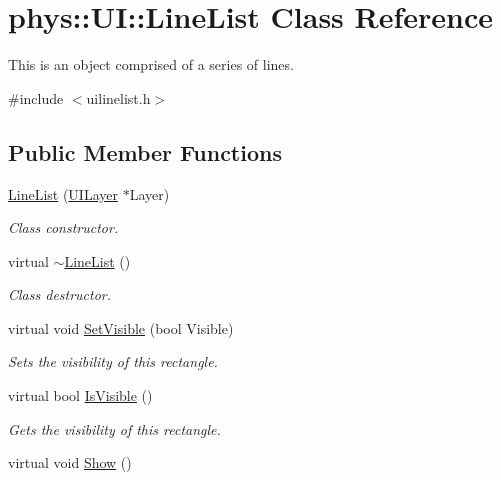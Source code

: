 \hypertarget{classphys_1_1UI_1_1LineList}{
\section{phys::UI::LineList Class Reference}
\label{d7/de8/classphys_1_1UI_1_1LineList}
}


This is an object comprised of a series of lines.  




{\ttfamily \#include $<$uilinelist.h$>$}

\subsection*{Public Member Functions}
\begin{DoxyCompactItemize}
\item 
\hyperlink{classphys_1_1UI_1_1LineList_a0de86be9d9ecbd6f903cc15e6f44e135}{LineList} (\hyperlink{classphys_1_1UILayer}{UILayer} $\ast$Layer)
\begin{DoxyCompactList}\small\item\em Class constructor. \item\end{DoxyCompactList}\item 
\hypertarget{classphys_1_1UI_1_1LineList_ae962ca10492137ed85f7b66a79d4887e}{
virtual \hyperlink{classphys_1_1UI_1_1LineList_ae962ca10492137ed85f7b66a79d4887e}{$\sim$LineList} ()}
\label{d7/de8/classphys_1_1UI_1_1LineList_ae962ca10492137ed85f7b66a79d4887e}

\begin{DoxyCompactList}\small\item\em Class destructor. \item\end{DoxyCompactList}\item 
virtual void \hyperlink{classphys_1_1UI_1_1LineList_acecf11c133825233afd73d55ba9e4c1d}{SetVisible} (bool Visible)
\begin{DoxyCompactList}\small\item\em Sets the visibility of this rectangle. \item\end{DoxyCompactList}\item 
virtual bool \hyperlink{classphys_1_1UI_1_1LineList_af8c50f2e60b5a087cc9f3a280e10bd72}{IsVisible} ()
\begin{DoxyCompactList}\small\item\em Gets the visibility of this rectangle. \item\end{DoxyCompactList}\item 
\hypertarget{classphys_1_1UI_1_1LineList_ae725a770a9b938d01f1a161be050fcc5}{
virtual void \hyperlink{classphys_1_1UI_1_1LineList_ae725a770a9b938d01f1a161be050fcc5}{Show} ()}
\label{d7/de8/classphys_1_1UI_1_1LineList_ae725a770a9b938d01f1a161be050fcc5}


\end{DoxyCompactItemize}
